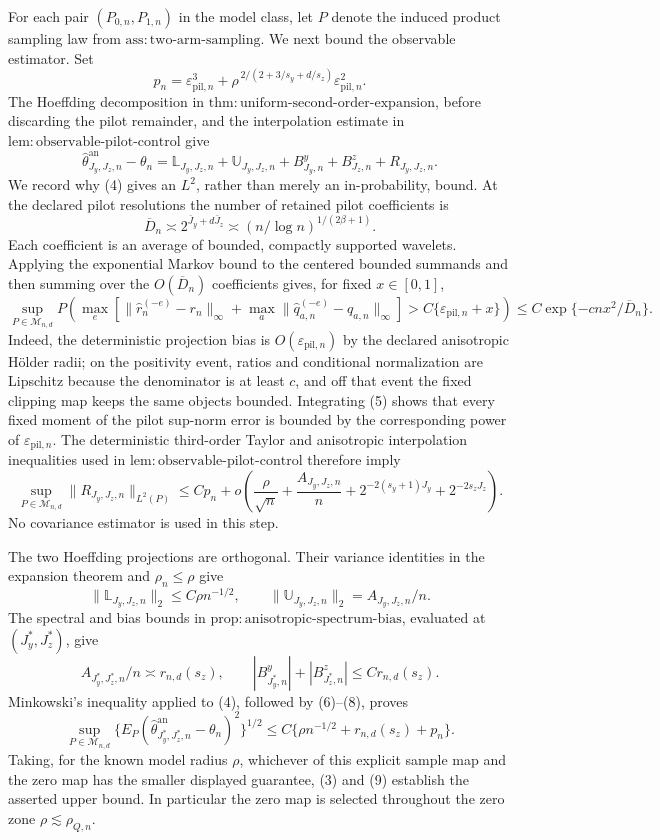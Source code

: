 For each pair \((P_{0,n},P_{1,n})\) in the model class, let \(P\) denote the induced product sampling law from \(\mathrm{ass{:}two\text{-}arm\text{-}sampling}\).  We next bound the observable estimator.  Set
\[
 p_n=\varepsilon_{\mathrm{pil},n}^3+
 \rho^{\,2/(2+3/s_y+d/s_z)}\varepsilon_{\mathrm{pil},n}^2.
\]
The Hoeffding decomposition in \(\mathrm{thm{:}uniform\text{-}second\text{-}order\text{-}expansion}\), before discarding the pilot remainder, and the interpolation estimate in \(\mathrm{lem{:}observable\text{-}pilot\text{-}control}\) give
\[
 \widehat\theta^{\mathrm{an}}_{J_y,J_z,n}-\theta_n
 =\mathbb L_{J_y,J_z,n}+\mathbb U_{J_y,J_z,n}
   +B^y_{J_y,n}+B^z_{J_z,n}+R_{J_y,J_z,n}. \tag{4}
\]
We record why (4) gives an \(L^2\), rather than merely an in-probability, bound.  At the declared pilot resolutions the number of retained pilot coefficients is
\[
 \overline D_n\asymp2^{\bar J_y+d\bar J_z}
 \asymp(n/\log n)^{1/(2\beta+1)}.
\]
Each coefficient is an average of bounded, compactly supported wavelets.  Applying the exponential Markov bound to the centered bounded summands and then summing over the \(O(\overline D_n)\) coefficients gives, for fixed \(x\in[0,1]\),
\[
 \sup_{P\in\mathcal M_{n,d}}
 P\!\left(\max_e\left[\|\widehat r_n^{(-e)}-r_n\|_\infty+
 \max_a\|\widehat q_{a,n}^{(-e)}-q_{a,n}\|_\infty\right]
 >C\{\varepsilon_{\mathrm{pil},n}+x\}\right)
 \le C\exp\{-c n x^2/\overline D_n\}. \tag{5}
\]
Indeed, the deterministic projection bias is \(O(\varepsilon_{\mathrm{pil},n})\) by the declared anisotropic H\"older radii; on the positivity event, ratios and conditional normalization are Lipschitz because the denominator is at least \(c\), and off that event the fixed clipping map keeps the same objects bounded.  Integrating (5) shows that every fixed moment of the pilot sup-norm error is bounded by the corresponding power of \(\varepsilon_{\mathrm{pil},n}\).  The deterministic third-order Taylor and anisotropic interpolation inequalities used in \(\mathrm{lem{:}observable\text{-}pilot\text{-}control}\) therefore imply
\[
 \sup_{P\in\mathcal M_{n,d}}\|R_{J_y,J_z,n}\|_{L^2(P)}
 \le C p_n+o\!\left(\frac{\rho}{\sqrt n}+\frac{A_{J_y,J_z,n}}n
       +2^{-2(s_y+1)J_y}+2^{-2s_zJ_z}\right). \tag{6}
\]
No covariance estimator is used in this step.

The two Hoeffding projections are orthogonal.  Their variance identities in the expansion theorem and \(\rho_n\le\rho\) give
\[
 \|\mathbb L_{J_y,J_z,n}\|_2\le C\rho n^{-1/2},
 \qquad
 \|\mathbb U_{J_y,J_z,n}\|_2=A_{J_y,J_z,n}/n. \tag{7}
\]
The spectral and bias bounds in \(\mathrm{prop{:}anisotropic\text{-}spectrum\text{-}bias}\), evaluated at \((J_y^*,J_z^*)\), give
\[
 A_{J_y^*,J_z^*,n}/n\asymp r_{n,d}(s_z),\qquad
 |B^y_{J_y^*,n}|+|B^z_{J_z^*,n}|\le C r_{n,d}(s_z). \tag{8}
\]
Minkowski's inequality applied to (4), followed by (6)--(8), proves
\[
 \sup_{P\in\mathcal M_{n,d}}
 \{E_P(\widehat\theta^{\mathrm{an}}_{J_y^*,J_z^*,n}-\theta_n)^2\}^{1/2}
 \le C\{\rho n^{-1/2}+r_{n,d}(s_z)+p_n\}. \tag{9}
\]
Taking, for the known model radius \(\rho\), whichever of this explicit sample map and the zero map has the smaller displayed guarantee, (3) and (9) establish the asserted upper bound.  In particular the zero map is selected throughout the zero zone \(\rho\lesssim\rho_{Q,n}\).

